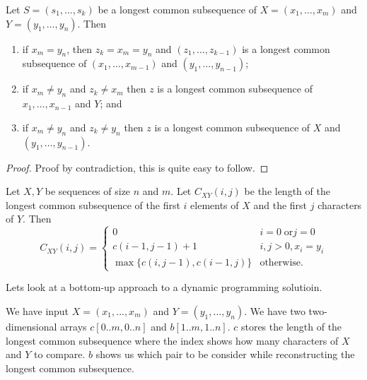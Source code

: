 \begin{theorem}[]
    Let 
    $S = (s_1, \ldots, s_k)$ 
    be a longest common subsequence of 
    $X = (x_1, \ldots, x_m)$ and $Y = (y_1, \ldots, y_n)$. 
    Then
    \begin{enumerate}
        \item if $x_m = y_n$, 
            then $z_k = x_m = y_n$ 
            and $(z_1, \ldots, z_{k - 1})$ 
            is a longest common subsequence of 
            $(x_1, \ldots, x_{m -1})$ 
            and 
            $(y_1, \ldots, y_{n - 1})$;
        \item if $x_m \neq y_n$ and $z_k \neq x_m$ 
            then $z$ is a longest common subsequence of 
            $x_1, \ldots, x_{n - 1}$ and $Y$; and
        \item if $x_m \neq y_n$ and $z_k \neq y_n$ then 
            $z$ is a longest common subsequence of 
            $X$ and $(y_1, \ldots, y_{n - 1})$.
    \end{enumerate}
\end{theorem}

\begin{proof}
    Proof by contradiction, this is quite easy to follow. 
\end{proof}

\begin{corollary}
    Let $X, Y$ be sequences of size $n$ and $m$. 
    Let $C_{XY}(i,j)$ be the length of the longest common subsequence of the first $i$ elements of $X$ and the first $j$ characters of $Y$. 
    Then
    \[ 
        C_{XY}(i, j) =
        \begin{cases}
            0 & i = 0 \;\text{or} j = 0 \\
            c(i - 1, j - 1) + 1 & i,j > 0, x_i = y_i \\
            \max\{c(i, j - 1), c(i - 1, j)\} & \text{otherwise}.
        \end{cases}
    \]
\end{corollary}

Lets look at a bottom-up approach to a dynamic programming solutioin.

\begin{algorithm}
    We have input $X = (x_1, \ldots, x_m)$ and $Y = (y_1, \ldots, y_n)$. 
    We have two two-dimensional arrays 
    $c[0..m, 0..n]$ and $b[1..m, 1..n]$. $c$ 
    stores the length of the longest common subsequence where the index shows how many characters of $X$ and $Y$ to compare. 
    $b$ shows us which pair to be consider while reconstructing the longest common subsequence.
\end{algorithm}
